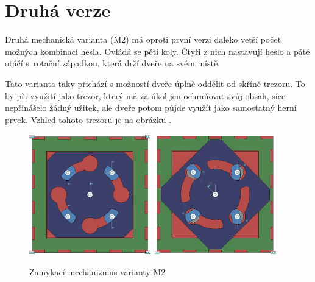 \section{Druhá verze}
\label{M2-vyvoj}

Druhá mechanická varianta (M2) má oproti první verzi daleko vetší počet možných kombinací hesla.
Ovládá se pěti koly. Čtyři z nich nastavují heslo a páté otáčí s~rotační západkou, která drží dveře na svém místě.

Tato varianta taky přichází s možností dveře úplně oddělit od skříně trezoru. To by při využití jako trezor, který
má za úkol jen ochraňovat svůj obsah, sice nepřinášelo žádný užitek, ale dveře potom půjde využít jako samostatný herní prvek. Vzhled tohoto trezoru je na obrázku .

\begin{figure}[htbp]
    \centering
    \includegraphics[width=150pt]{kapitoly/obrazky/M2/mechanizmus_odemcen.png}
    \includegraphics[width=150pt]{kapitoly/obrazky/M2/mechanizmus_zamceno.png}
    \caption{Zamykací mechanizmus varianty M2}
    \label{fig:M2-mechanizmus}
\end{figure}